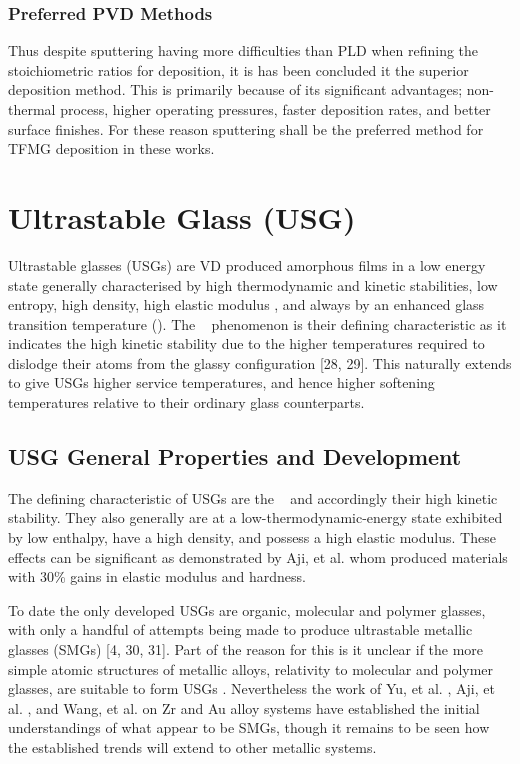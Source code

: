 \documentclass[a4paper,12pt,oneside]{report}%
\begin{document}
\subsubsection{Preferred PVD Methods}
Thus despite sputtering having more difficulties than PLD when refining the stoichiometric ratios for deposition, it is has been concluded it the superior deposition method. This is primarily because of its significant advantages; non-thermal process, higher operating pressures, faster deposition rates, and better surface finishes. For these reason sputtering shall be the preferred method for TFMG deposition in these works. 

\section{Ultrastable Glass (USG)}
Ultrastable glasses (USGs) are VD produced amorphous films in a low energy state generally characterised by high thermodynamic and kinetic stabilities, low entropy, high density, high elastic modulus , and always by an enhanced glass transition temperature (\dTg). The \dTg~ phenomenon is their defining characteristic as it indicates the high kinetic stability due to the higher temperatures required to dislodge their atoms from the glassy configuration [28, 29]. This naturally extends to give USGs higher service temperatures, and hence higher softening temperatures relative to their ordinary glass counterparts.

\subsection{USG General Properties and Development}
The defining characteristic of USGs are the \dTg~ and accordingly their high kinetic stability. They also generally are at a low-thermodynamic-energy state exhibited by low enthalpy, have a high density, and possess a high elastic modulus. These effects can be significant as demonstrated by Aji, et al. \cite{Aji2013} whom produced materials with 30\% gains in elastic modulus and hardness.  

To date the only developed USGs are organic, molecular and polymer glasses, with only a handful of attempts being made to produce ultrastable metallic glasses (SMGs) [4, 30, 31]. Part of the reason for this is it unclear if the more simple atomic structures of metallic alloys, relativity to molecular and polymer glasses, are suitable to form USGs \cite{Yu2013}. Nevertheless the work of Yu, et al. \cite{Yu2013}, Aji, et al. \cite{Aji2013}, and Wang, et al. \cite{Wang2014} on Zr and Au alloy systems have established the initial understandings of what appear to be SMGs, though it remains to be seen how the established trends will extend to other metallic systems. 
\end{document}
